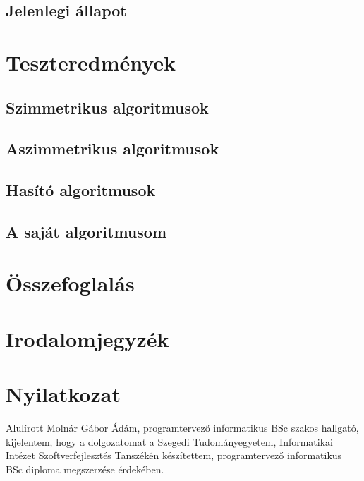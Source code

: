 \documentclass[12pt]{report} %
\begin{document}
\section{Jelenlegi állapot} %

\chapter{Teszteredmények} %

\section{Szimmetrikus algoritmusok} %

\section{Aszimmetrikus algoritmusok} %

\section{Hasító algoritmusok} %

\section{A saját algoritmusom} %

\chapter{Összefoglalás} %

\chapter*{Irodalomjegyzék} %

\chapter*{Nyilatkozat} %

Alulírott Molnár Gábor Ádám, programtervező informatikus BSc szakos hallgató, kijelentem, hogy a dolgozatomat a Szegedi Tudományegyetem, Informatikai Intézet Szoftverfejlesztés Tanszékén készítettem, programtervező informatikus BSc diploma megszerzése érdekében.
\end{document}
